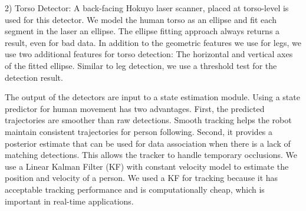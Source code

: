 \documentclass[3p]{elsarticle}
\begin{document}
2) Torso Detector: A back-facing Hokuyo laser scanner, placed at torso-level
is used for this detector. We model
the human torso as an ellipse and fit each segment in the laser an ellipse. The ellipse fitting approach always returns a result, even for bad data. In addition to the geometric features we use for legs, we use two additional features for torso detection: The horizontal and vertical axes of the fitted ellipse. Similar to leg detection, we use a threshold test for the detection result.

The output of the detectors are input to a state estimation module. Using a state predictor for human movement has two advantages. First, the predicted trajectories are smoother than
raw detections. Smooth tracking helps the robot maintain consistent trajectories
for person following. Second, it provides a posterior estimate that can be used for data association when there is a lack of
matching detections. This allows the tracker to handle temporary occlusions. We use
a Linear Kalman Filter (KF) with constant velocity model to estimate the position and velocity of a person. We used a KF for tracking because it has acceptable tracking performance and is computationally cheap, which is important in real-time applications.
\end{document}
